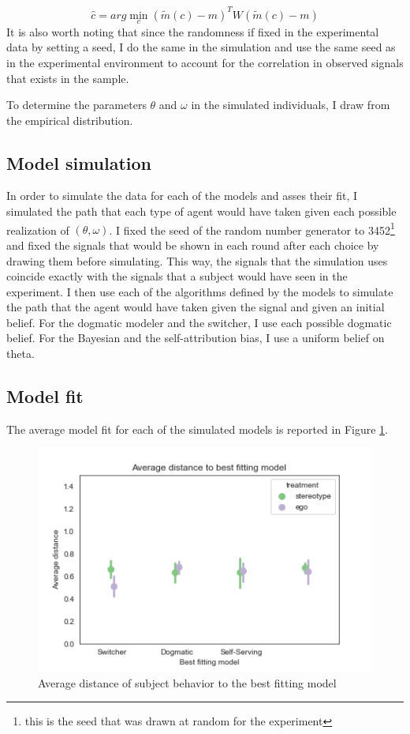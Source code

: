 \documentclass[
  12pt,
]{article}
\begin{document}
\[ \hat{c} = arg\min_c (\tilde{m}(c)-m)^T W(\tilde{m}(c)-m)\] It is also
worth noting that since the randomness if fixed in the experimental data
by setting a seed, I do the same in the simulation and use the same seed
as in the experimental environment to account for the correlation in
observed signals that exists in the sample.

To determine the parameters \(\theta\) and \(\omega\) in the simulated
individuals, I draw from the empirical distribution.

\hypertarget{model-simulation}{%
\subsection{Model simulation}\label{model-simulation}}

In order to simulate the data for each of the models and asses their
fit, I simulated the path that each type of agent would have taken given
each possible realization of \((\theta, \omega)\). I fixed the seed of
the random number generator to
3452\footnote{this is the seed that was drawn at random for the experiment}
and fixed the signals that would be shown in each round after each
choice by drawing them before simulating. This way, the signals that the
simulation uses coincide exactly with the signals that a subject would
have seen in the experiment. I then use each of the algorithms defined
by the models to simulate the path that the agent would have taken given
the signal and given an initial belief. For the dogmatic modeler and the
switcher, I use each possible dogmatic belief. For the Bayesian and the
self-attribution bias, I use a uniform belief on theta.

\hypertarget{model-fit-1}{%
\subsection{Model fit}\label{model-fit-1}}

The average model fit for each of the simulated models is reported in
Figure \ref{fig:model-fit}.

\begin{figure}
\hypertarget{fig:model-fit}{%
\centering
\includegraphics{../figures/model_min_distance.png}
\caption{Average distance of subject behavior to the best fitting
model}\label{fig:model-fit}
}
\end{figure}
\end{document}
